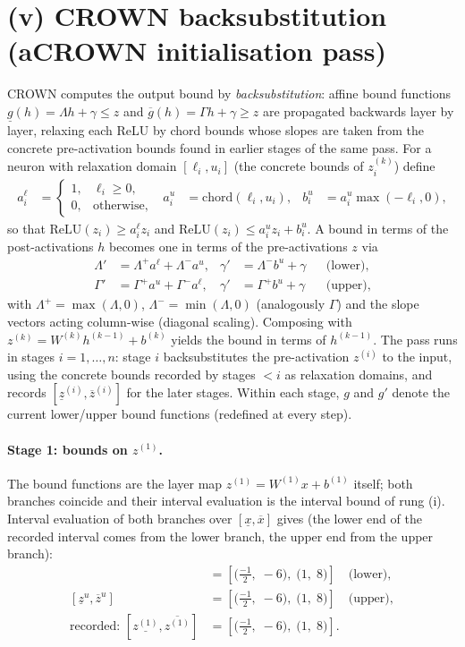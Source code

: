 \documentclass[11pt]{article}
\begin{document}
\section{(v) CROWN backsubstitution (aCROWN initialisation pass)}
CROWN computes the output bound by \emph{backsubstitution}: affine bound functions
$\underline{g}(h) = \Lambda h + \gamma \le z$ and $\overline{g}(h) = \Gamma h + \gamma \ge z$
are propagated backwards layer by layer, relaxing each ReLU by chord bounds whose slopes are taken
from the concrete pre-activation bounds found in earlier stages of the same pass. For a neuron with
relaxation domain $[\ell_i, u_i]$ (the concrete bounds of $z^{(k)}_i$) define
\begin{align*}
a^{\ell}_i &= \begin{cases} 1, & \ell_i \ge 0,\\ 0, & \text{otherwise}, \end{cases} & a^{u}_i &= \mathrm{chord}(\ell_i, u_i), & b^{u}_i &= a^{u}_i \max(-\ell_i, 0),
\end{align*}
so that $\mathrm{ReLU}(z_i) \ge a^{\ell}_i z_i$ and
$\mathrm{ReLU}(z_i) \le a^{u}_i z_i + b^{u}_i$. A bound in terms of the post-activations $h$ becomes
one in terms of the pre-activations $z$ via
\begin{align*}
\Lambda' &= \Lambda^{+} a^{\ell} + \Lambda^{-} a^{u}, & \gamma' &= \Lambda^{-} b^{u} + \gamma && \text{(lower)}, \\ 
\Gamma' &= \Gamma^{+} a^{u} + \Gamma^{-} a^{\ell}, & \gamma' &= \Gamma^{+} b^{u} + \gamma && \text{(upper)},
\end{align*}
with $\Lambda^{+} = \max(\Lambda, 0)$, $\Lambda^{-} = \min(\Lambda, 0)$ (analogously $\Gamma$) and the
slope vectors acting column-wise (diagonal scaling). Composing with
$z^{(k)} = W^{(k)} h^{(k-1)} + b^{(k)}$ yields the bound in terms of $h^{(k-1)}$. The pass runs in
stages $i = 1, \dots, n$: stage $i$ backsubstitutes the pre-activation $z^{(i)}$ to the input, using
the concrete bounds recorded by stages $< i$ as relaxation domains, and records
$[\underline{z}^{(i)}, \overline{z}^{(i)}]$ for the later stages. Within each stage, $g$ and $g'$
denote the current lower/upper bound functions (redefined at every step).
\paragraph{Stage 1: bounds on $z^{(1)}$.}
The bound functions are the layer map $z^{(1)} = W^{(1)} x + b^{(1)}$ itself; both branches coincide and their interval evaluation is the interval bound of rung (i).
Interval evaluation of both branches over $[\underline{x}, \overline{x}]$ gives (the lower end of the recorded interval comes from the lower branch, the upper end from the upper branch):
\begin{align*}
[\underline{z}^{\ell}, \overline{z}^{\ell}] &= [\bigl(\frac{-1}{2},\; -6\bigr),\; \bigl(1,\; 8\bigr)] \quad\text{(lower)}, \\
[\underline{z}^{u}, \overline{z}^{u}] &= [\bigl(\frac{-1}{2},\; -6\bigr),\; \bigl(1,\; 8\bigr)] \quad\text{(upper)}, \\
\text{recorded: } [\underline{z^{(1)}}, \overline{z^{(1)}}] &= [\bigl(\frac{-1}{2},\; -6\bigr),\; \bigl(1,\; 8\bigr)].
\end{align*}
\end{document}
